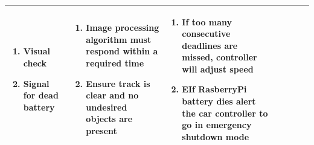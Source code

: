 \documentclass [10pt]{article}
\begin{document}
{\begin{minipage}{\textwidth}
\begin{longtable}{ |p{ }  | p{ } |  p{ } |  p{ } | p{ } | p{ } |  p{ }|}
\begin{minipage}{.18\textwidth}
                \begin{enumerate}
                    \item Visual check
                    \item Signal for dead battery \vspace {1mm}
                \end{enumerate}
        \end{minipage}
    & \cellcolor{tableCell}\begin{minipage}{.23\textwidth} 
                \vspace{2mm}
                \begin{enumerate}
                    \item Image processing algorithm must respond within a required time
                    \item Ensure track is clear and no undesired objects are present\vspace {1mm}
                \end{enumerate}
        \end{minipage}
    
    
    & \begin{minipage}{.24 \columnwidth} 
                \vspace{2mm}
                \begin{enumerate}
                    \item If too many consecutive deadlines are missed, controller will adjust speed
                    \item EIf RasberryPi battery dies alert the car controller to go in emergency shutdown mode\vspace {1mm}
                \end{enumerate}
        \end{minipage} \\ \hline
    
   
    
    
    

\end{longtable}
\end{minipage}}
\end{document}
